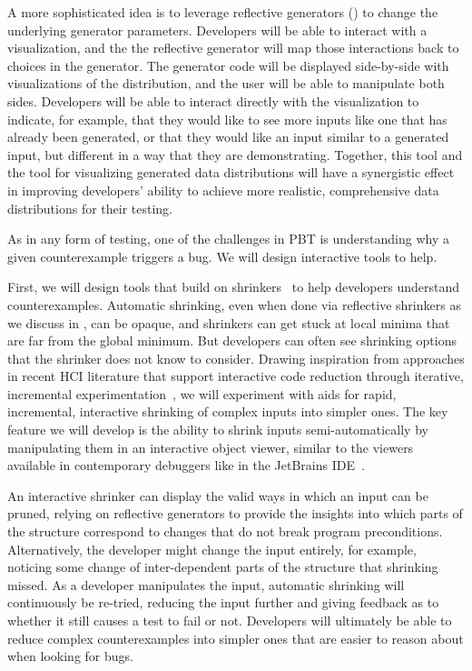 A more sophisticated idea is to leverage
reflective generators () to change the underlying
generator parameters. Developers will be able to interact with a visualization,
and the the reflective generator will map those interactions
back to choices
in the generator.  The generator code will be displayed
side-by-side with visualizations of the distribution, and the user
will be able to manipulate both sides.
Developers will be able to interact directly with the visualization to
indicate, for example, that they would like to see more inputs like
one that has already
been generated, or that they would like an input similar to a generated input,
but different in a way that they are demonstrating. Together, this tool and the
tool for visualizing generated data distributions will have a synergistic effect
in improving developers' ability to achieve more
realistic, comprehensive data distributions for their testing.


%
As in any form of testing, one of the challenges in PBT is understanding why
a given counterexample triggers a bug.  We will design interactive
tools to help.

First, we will design tools that build on
shrinkers~\cite{hughes_quickcheck_2007,arts_shrinking_2014} to help developers
understand counterexamples. Automatic shrinking, even when done via reflective
shrinkers as we discuss in , can be opaque, and
shrinkers can get stuck at local minima that are far from the global minimum.
But developers can often see shrinking options that the shrinker does not know to consider.
Drawing inspiration from approaches in recent HCI literature that support
interactive code reduction through iterative, incremental
experimentation~\cite{ref:lim2018ply,ref:head2018interactive,ref:holmes2012systematizing,ref:hibschman2016telescope},
we will experiment with aids for rapid, incremental, interactive
shrinking of complex
inputs into simpler ones. The key feature we will develop is the ability to
shrink inputs semi-automatically by manipulating them in an interactive
object viewer, similar to the viewers available in contemporary
debuggers like in the JetBrains IDE~\cite{tool:jetbrains}.

An interactive shrinker can display the valid ways in which an input
can be pruned,
relying on reflective generators to provide the insights into which parts of the
structure correspond to changes that do not break program preconditions.
Alternatively, the developer might change
the input entirely, for example, noticing some change of inter-dependent parts
of the structure that shrinking missed.  As a developer manipulates the input,
automatic shrinking will continuously be re-tried, reducing the input further
and giving feedback as to whether it still causes a test to fail or not.
Developers will ultimately be able to reduce complex counterexamples into
simpler ones that are easier to reason about when looking for bugs.

